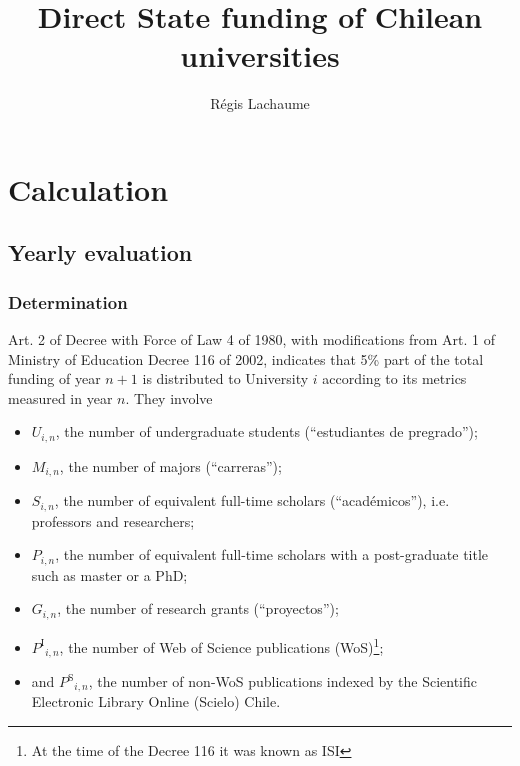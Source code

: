 \documentclass[twocolumn]{article}
\title{Direct State funding of Chilean universities}
\author{Régis Lachaume}
\def\npup{\ensuremath{U}}
\def\nmaj{\ensuremath{M}}
\def\nprof{\ensuremath{S}}
\def\ngrad{\ensuremath{P}}
\def\ngrant{\ensuremath{G}}
\def\nisi{\ensuremath{P^\text{I}}}
\def\nscielo{\ensuremath{P^\text{S}}}
\begin{document}
\maketitle

\section{Calculation}
\subsection{Yearly evaluation}
\subsubsection{Determination}
\label{sec:metrics}

Art. 2 of Decree with Force of Law 4 of 1980, with modifications from Art. 1 of Ministry of Education Decree 116 of 2002, indicates that 5\% part of the total funding of year $n + 1$ is distributed to University $i$ according to its metrics measured in year $n$. They involve 
\begin{itemize}
\item $\npup_{i,n}$, the number of undergraduate students (``estudiantes de pregrado'');
\item $\nmaj_{i,n}$, the number of majors (``carreras'');
\item $\nprof_{i,n}$, the number of equivalent full-time scholars (``académicos''), i.e. professors and researchers;
\item $\ngrad_{i,n}$, the number of equivalent full-time scholars with a post-graduate title such as master or a PhD; 
\item $\ngrant_{i,n}$, the number of research grants (``proyectos'');
\item $\nisi_{i,n}$, the number of Web of Science publications (WoS)\footnote{At the time of the Decree 116 it was known as ISI}; 
\item and $\nscielo_{i,n}$, the number of non-WoS publications indexed by the Scientific Electronic Library Online (Scielo) Chile. 
\end{itemize}
\end{document}
